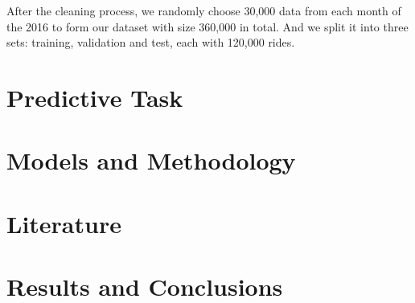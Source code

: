 After the cleaning process, we randomly choose 30,000 data from each month of the 2016 to form our dataset with size 360,000 in total. And we split it into three sets: training, validation and test, each with 120,000 rides.


\section{Predictive Task}

\section{Models and Methodology}

\section{Literature}

\section{Results and Conclusions}







